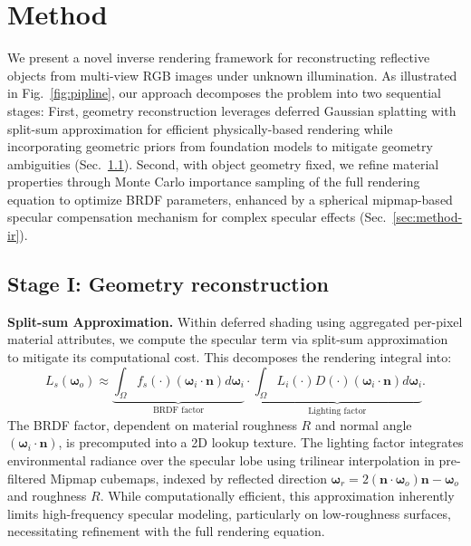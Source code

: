 \section{Method}
\label{sec:method}
We present a novel inverse rendering framework for reconstructing reflective objects from multi-view RGB images under unknown illumination. As illustrated in Fig.~\ref{fig:pipline}, our approach decomposes the problem into two sequential stages: First, geometry reconstruction leverages deferred Gaussian splatting with split-sum approximation for efficient physically-based rendering while incorporating geometric priors from foundation models to mitigate geometry ambiguities (Sec.~\ref{sec:method-geo}). Second, with object geometry fixed, we refine material properties through Monte Carlo importance sampling of the full rendering equation to optimize BRDF parameters, enhanced by a spherical mipmap-based specular compensation mechanism for complex specular effects (Sec.~\ref{sec:method-ir}).
\subsection{Stage I: Geometry reconstruction}
\label{sec:method-geo}
\noindent\textbf{Split-sum Approximation.}
Within deferred shading using aggregated per-pixel material attributes, we compute the specular term via split-sum approximation~\cite{munkberg2022extracting} to mitigate its computational cost. This decomposes the rendering integral into:
\begin{equation}
\label{eq:split_sum}
L_s(\boldsymbol{\omega}_o) \approx \underbrace{\int_{\Omega} f_s(\cdot) (\boldsymbol{\omega}_i\!\cdot\!\boldsymbol{n}) d\boldsymbol{\omega}_i}_{\text{BRDF factor}} \cdot \underbrace{\int_{\Omega} L_i(\cdot) D(\cdot)(\boldsymbol{\omega}_i\!\cdot\!\boldsymbol{n})  d\boldsymbol{\omega}_i}_{\text{Lighting factor}}.
\end{equation}
The BRDF factor, dependent on material roughness $R$ and normal angle $(\boldsymbol{\omega}_i \cdot \boldsymbol{n})$, is precomputed into a 2D lookup texture. The lighting factor integrates environmental radiance over the specular lobe using trilinear interpolation in pre-filtered Mipmap cubemaps, indexed by reflected direction $\boldsymbol{\omega}_r = 2(\boldsymbol{n} \cdot \boldsymbol{\omega}_o)\boldsymbol{n} - \boldsymbol{\omega}_o$ and roughness $R$. 
While computationally efficient, this approximation inherently limits high-frequency specular modeling, particularly on low-roughness surfaces, necessitating refinement with the full rendering equation.

